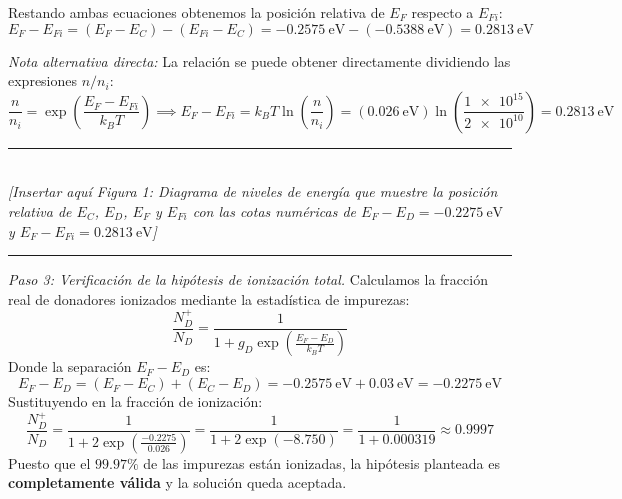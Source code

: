 \begin{problema}
Restando ambas ecuaciones obtenemos la posición relativa de $E_F$ respecto a $E_{Fi}$:
\[
E_F - E_{Fi} = (E_F - E_C) - (E_{Fi} - E_C) = \SI{-0.2575}{\eV} - (\SI{-0.5388}{\eV}) = \SI{0.2813}{\eV}
\]

\textit{Nota alternativa directa:} La relación se puede obtener directamente dividiendo las expresiones $n/n_i$:
\[
\frac{n}{n_i} = \exp\left( \frac{E_F - E_{Fi}}{k_B T} \right) \implies E_F - E_{Fi} = k_B T \ln\left( \frac{n}{n_i} \right) = (\SI{0.026}{\eV}) \ln\left( \frac{\num{1e15}}{\num{2e10}} \right) = \SI{0.2813}{\eV}
\]

\begin{center}
    \rule{0.8\textwidth}{0.4pt} \\[2ex]
    \textit{[Insertar aquí Figura 1: Diagrama de niveles de energía que muestre la posición relativa de $E_C$, $E_D$, $E_F$ y $E_{Fi}$ con las cotas numéricas de $E_F - E_D = \SI{-0.2275}{\eV}$ y $E_F - E_{Fi} = \SI{0.2813}{\eV}$]} \\[2ex]
    \rule{0.8\textwidth}{0.4pt}
    \label{fig:problema_3_diagrama_bandas}
\end{center}

\textit{Paso 3: Verificación de la hipótesis de ionización total.}
Calculamos la fracción real de donadores ionizados mediante la estadística de impurezas:
\[
\frac{N_D^+}{N_D} = \frac{1}{1 + g_D \exp\left( \frac{E_F - E_D}{k_B T} \right)}
\]
Donde la separación $E_F - E_D$ es:
\[
E_F - E_D = (E_F - E_C) + (E_C - E_D) = \SI{-0.2575}{\eV} + \SI{0.03}{\eV} = \SI{-0.2275}{\eV}
\]
Sustituyendo en la fracción de ionización:
\[
\frac{N_D^+}{N_D} = \frac{1}{1 + 2 \exp\left( \frac{-0.2275}{0.026} \right)} = \frac{1}{1 + 2 \exp(-8.750)} = \frac{1}{1 + \num{0.000319}} \approx 0.9997
\]
Puesto que el $99.97\%$ de las impurezas están ionizadas, la hipótesis planteada es \textbf{completamente válida} y la solución queda aceptada.


\end{problema}
